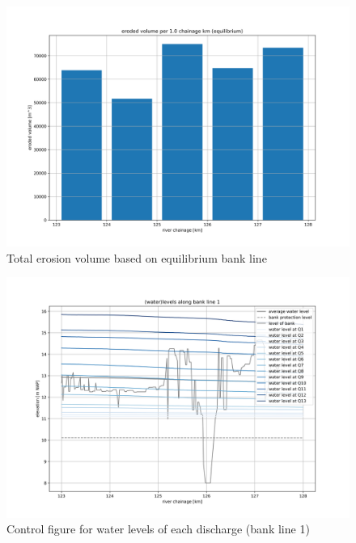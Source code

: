 \begin{figure}
\includegraphics[width=\textwidth]{figures/5_eroded_volume_eq.png}
\caption{Total erosion volume based on equilibrium bank line}
\label{Fig2.7}
\end{figure}

\begin{figure}
\includegraphics[width=\textwidth]{figures/6_levels_bank_1.png}
\caption{Control figure for water levels of each discharge (bank line 1)}
\label{Fig2.8}
\end{figure}

